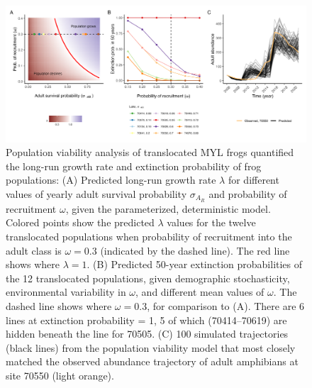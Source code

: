 \documentclass[9pt,twocolumn,twoside,lineno]{pnas-new}
\begin{document}
\begin{figure}

{\centering \includegraphics[width=\textwidth]{figures/pop_viability_figures_for_manuscript.jpg}

}

\caption{\label{fig-viability}Population viability analysis of
translocated MYL frogs quantified the long-run growth rate and
extinction probability of frog populations: (A) Predicted long-run
growth rate \(\lambda\) for different values of yearly adult survival
probability \(\sigma_{A_R}\) and probability of recruitment \(\omega\),
given the parameterized, deterministic model. Colored points show the
predicted \(\lambda\) values for the twelve translocated populations
when probability of recruitment into the adult class is \(\omega = 0.3\)
(indicated by the dashed line). The red line shows where
\(\lambda = 1\). (B) Predicted 50-year extinction probabilities of the
12 translocated populations, given demographic stochasticity,
environmental variability in \(\omega\), and different mean values of
\(\omega\). The dashed line shows where \(\omega = 0.3\), for comparison
to (A). There are 6 lines at extinction probability = 1, 5 of which
(70414--70619) are hidden beneath the line for 70505. (C) 100 simulated
trajectories (black lines) from the population viability model that most
closely matched the observed abundance trajectory of adult amphibians at
site 70550 (light orange).}

\end{figure}

\newpage
\end{document}
